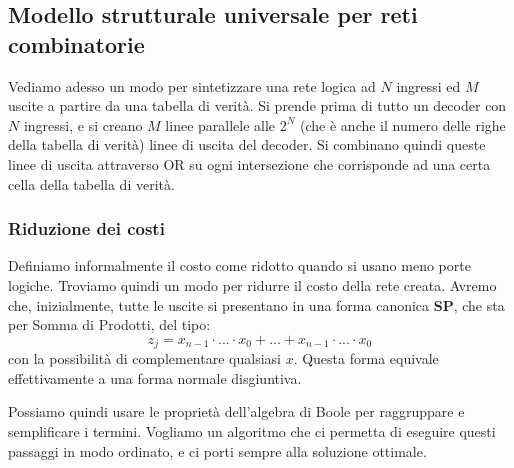 \documentclass[a4paper,11pt]{article}
\begin{document}
\subsection{Modello strutturale universale per reti combinatorie}
Vediamo adesso un modo per sintetizzare una rete logica ad $N$ ingressi ed $M$ uscite a partire da una tabella di verità.
Si prende prima di tutto un decoder con $N$ ingressi, e si creano $M$ linee parallele alle $2^N$ (che è anche il numero delle righe della tabella di verità) linee di uscita del decoder.
Si combinano quindi queste linee di uscita attraverso OR su ogni intersezione che corrisponde ad una certa cella della tabella di verità.

\subsubsection{Riduzione dei costi}
Definiamo informalmente il costo come ridotto quando si usano meno porte logiche.
Troviamo quindi un modo per ridurre il costo della rete creata.
Avremo che, inizialmente, tutte le uscite si presentano in una forma canonica \textbf{SP}, che sta per Somma di Prodotti, del tipo:
$$ 
z_j = x_{n-1} \cdot ... \cdot x_0 + ... + x_{n-1} \cdot ... \cdot x_0
$$
con la possibilità di complementare qualsiasi $x$. 
Questa forma equivale effettivamente a una forma normale disgiuntiva.

Possiamo quindi usare le proprietà dell'algebra di Boole per raggruppare e semplificare i termini.
Vogliamo un algoritmo che ci permetta di eseguire questi passaggi in modo ordinato, e ci porti sempre alla soluzione ottimale.
\end{document}
